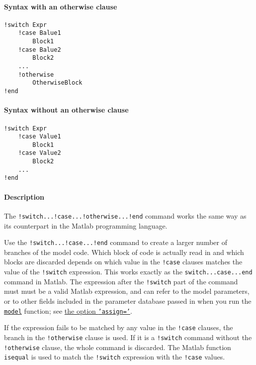 


	\paragraph{Syntax with an otherwise
clause}\label{syntax-with-an-otherwise-clause}

\begin{verbatim}
!switch Expr
    !case Balue1
        Block1
    !case Balue2
        Block2
    ...
    !otherwise
        OtherwiseBlock
!end
\end{verbatim}

\paragraph{Syntax without an otherwise
clause}\label{syntax-without-an-otherwise-clause}

\begin{verbatim}
!switch Expr
    !case Value1
        Block1
    !case Value2
        Block2
    ...
!end
\end{verbatim}

\paragraph{Description}\label{description}

The \texttt{!switch...!case...!otherwise...!end} command works the same
way as its counterpart in the Matlab programming language.

Use the \texttt{!switch...!case...!end} command to create a larger
number of branches of the model code. Which block of code is actually
read in and which blocks are discarded depends on which value in the
\texttt{!case} clauses matches the value of the \texttt{!switch}
expression. This works exactly as the \texttt{switch...case...end}
command in Matlab. The expression after the \texttt{!switch} part of the
command must must be a valid Matlab expression, and can refer to the
model parameters, or to other fields included in the parameter database
passed in when you run the \href{model/model}{\texttt{model}} function;
see \href{model/model}{the option \texttt{'assign='}}.

If the expression fails to be matched by any value in the \texttt{!case}
clauses, the branch in the \texttt{!otherwise} clause is used. If it is
a \texttt{!switch} command without the \texttt{!otherwise} clause, the
whole command is discarded. The Matlab function \texttt{isequal} is used
to match the \texttt{!switch} expression with the \texttt{!case} values.

